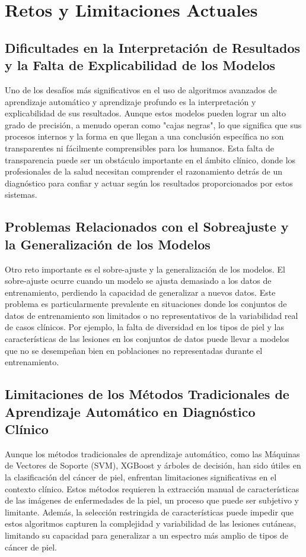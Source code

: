 \section*{Retos y Limitaciones Actuales}

\subsection*{Dificultades en la Interpretación de Resultados y la Falta de Explicabilidad de los Modelos}

Uno de los desafíos más significativos en el uso de algoritmos avanzados de aprendizaje automático y aprendizaje profundo es la interpretación y explicabilidad de sus resultados. Aunque estos modelos pueden lograr un alto grado de precisión, a menudo operan como "cajas negras", lo que significa que sus procesos internos y la forma en que llegan a una conclusión específica no son transparentes ni fácilmente comprensibles para los humanos. Esta falta de transparencia puede ser un obstáculo importante en el ámbito clínico, donde los profesionales de la salud necesitan comprender el razonamiento detrás de un diagnóstico para confiar y actuar según los resultados proporcionados por estos sistemas. %


\subsection*{Problemas Relacionados con el Sobreajuste y la Generalización de los Modelos}
Otro reto importante es el sobre-ajuste y la generalización de los modelos. El sobre-ajuste ocurre cuando un modelo se ajusta demasiado a los datos de entrenamiento, perdiendo la capacidad de generalizar a nuevos datos. Este problema es particularmente prevalente en situaciones donde los conjuntos de datos de entrenamiento son limitados o no representativos de la variabilidad real de casos clínicos. Por ejemplo, la falta de diversidad en los tipos de piel y las características de las lesiones en los conjuntos de datos puede llevar a modelos que no se desempeñan bien en poblaciones no representadas durante el entrenamiento. %

\subsection*{Limitaciones de los Métodos Tradicionales de Aprendizaje Automático en Diagnóstico Clínico}
Aunque los métodos tradicionales de aprendizaje automático, como las Máquinas de Vectores de Soporte (SVM), XGBoost y árboles de decisión, han sido útiles en la clasificación del cáncer de piel, enfrentan limitaciones significativas en el contexto clínico. Estos métodos requieren la extracción manual de características de las imágenes de enfermedades de la piel, un proceso que puede ser subjetivo y limitante. Además, la selección restringida de características puede impedir que estos algoritmos capturen la complejidad y variabilidad de las lesiones cutáneas, limitando su capacidad para generalizar a un espectro más amplio de tipos de cáncer de piel.%

